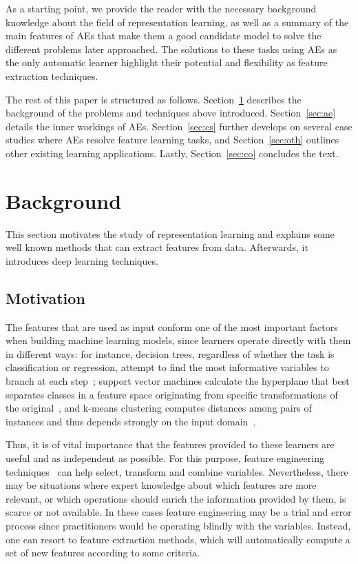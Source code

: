 \documentclass[
	fontsize=11pt, %
	twoside=false, %
	open=any, %
	secnumdepth=1, %
]{kaobook}
\begin{document}
As a starting point, we provide the reader with the necessary background knowledge about the field of representation learning, as well as a summary of the main features of AEs that make them a good candidate model to solve the different problems later approached. The solutions to these tasks using AEs as the only automatic learner highlight their potential and flexibility as feature extraction techniques. 


The rest of this paper is structured as follows. Section~\ref{sec:bg} describes the background of the problems and techniques above introduced. Section~\ref{sec:ae} details the inner workings of AEs. Section~\ref{sec:cs} further develops on several case studies where AEs resolve feature learning tasks, and Section~\ref{sec:oth} outlines other existing learning applications. Lastly, Section~\ref{sec:co} concludes the text.

\section{Background}\label{sec:bg}

This section motivates the study of representation learning and explains some well known methods that can extract features from data. Afterwards, it introduces deep learning techniques.

\subsection{Motivation}

The features that are used as input conform one of the most important factors when building machine learning models, since learners operate directly with them in different ways: for instance, decision trees, regardless of whether the task is  classification or regression, attempt to find the most informative variables to branch at each step~\cite{kotsiantis2007supervised}; support vector machines calculate the hyperplane that best separates classes in a feature space originating from specific transformations of the original~\cite{kotsiantis2007supervised}, and k-means clustering computes distances among pairs of instances and thus depends strongly on the input domain~\cite{Jain1999DataCA}.

Thus, it is of vital importance that the features provided to these learners are useful and as independent as possible. For this purpose, feature engineering techni\-ques~\cite{domingos-useful} can help select, transform and combine variables. Nevertheless, there may be situations where expert knowledge about which features are more relevant, or which operations should enrich the information provided by them, is scarce or not available. In these cases feature engineering may be a trial and error process since practitioners would be operating blindly with the variables. Instead, one can resort to feature extraction methods, which will automatically compute a set of new features according to some criteria.
\end{document}
